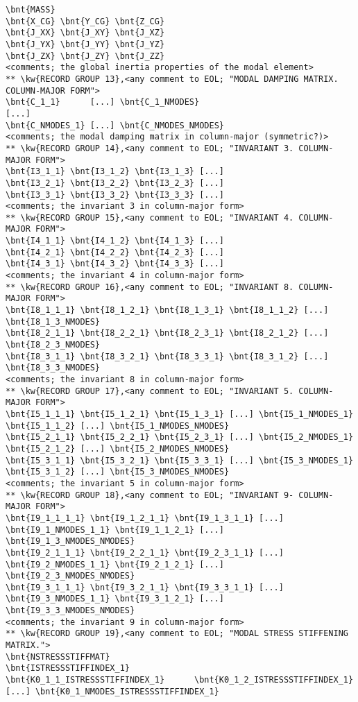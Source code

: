 {\begin{Verbatim}[commandchars=\\\{\}]
\bnt{MASS}
\bnt{X_CG} \bnt{Y_CG} \bnt{Z_CG}
\bnt{J_XX} \bnt{J_XY} \bnt{J_XZ}
\bnt{J_YX} \bnt{J_YY} \bnt{J_YZ}
\bnt{J_ZX} \bnt{J_ZY} \bnt{J_ZZ}
<comments; the global inertia properties of the modal element>
** \kw{RECORD GROUP 13},<any comment to EOL; "MODAL DAMPING MATRIX. COLUMN-MAJOR FORM">
\bnt{C_1_1}      [...] \bnt{C_1_NMODES}
[...]
\bnt{C_NMODES_1} [...] \bnt{C_NMODES_NMODES}
<comments; the modal damping matrix in column-major (symmetric?)>
** \kw{RECORD GROUP 14},<any comment to EOL; "INVARIANT 3. COLUMN-MAJOR FORM">
\bnt{I3_1_1} \bnt{I3_1_2} \bnt{I3_1_3} [...]
\bnt{I3_2_1} \bnt{I3_2_2} \bnt{I3_2_3} [...]
\bnt{I3_3_1} \bnt{I3_3_2} \bnt{I3_3_3} [...]
<comments; the invariant 3 in column-major form>
** \kw{RECORD GROUP 15},<any comment to EOL; "INVARIANT 4. COLUMN-MAJOR FORM">
\bnt{I4_1_1} \bnt{I4_1_2} \bnt{I4_1_3} [...]
\bnt{I4_2_1} \bnt{I4_2_2} \bnt{I4_2_3} [...]
\bnt{I4_3_1} \bnt{I4_3_2} \bnt{I4_3_3} [...]
<comments; the invariant 4 in column-major form>
** \kw{RECORD GROUP 16},<any comment to EOL; "INVARIANT 8. COLUMN-MAJOR FORM">
\bnt{I8_1_1_1} \bnt{I8_1_2_1} \bnt{I8_1_3_1} \bnt{I8_1_1_2} [...] \bnt{I8_1_3_NMODES}
\bnt{I8_2_1_1} \bnt{I8_2_2_1} \bnt{I8_2_3_1} \bnt{I8_2_1_2} [...] \bnt{I8_2_3_NMODES}
\bnt{I8_3_1_1} \bnt{I8_3_2_1} \bnt{I8_3_3_1} \bnt{I8_3_1_2} [...] \bnt{I8_3_3_NMODES}
<comments; the invariant 8 in column-major form>
** \kw{RECORD GROUP 17},<any comment to EOL; "INVARIANT 5. COLUMN-MAJOR FORM">
\bnt{I5_1_1_1} \bnt{I5_1_2_1} \bnt{I5_1_3_1} [...] \bnt{I5_1_NMODES_1} \bnt{I5_1_1_2} [...] \bnt{I5_1_NMODES_NMODES}
\bnt{I5_2_1_1} \bnt{I5_2_2_1} \bnt{I5_2_3_1} [...] \bnt{I5_2_NMODES_1} \bnt{I5_2_1_2} [...] \bnt{I5_2_NMODES_NMODES}
\bnt{I5_3_1_1} \bnt{I5_3_2_1} \bnt{I5_3_3_1} [...] \bnt{I5_3_NMODES_1} \bnt{I5_3_1_2} [...] \bnt{I5_3_NMODES_NMODES}
<comments; the invariant 5 in column-major form>
** \kw{RECORD GROUP 18},<any comment to EOL; "INVARIANT 9- COLUMN-MAJOR FORM">
\bnt{I9_1_1_1_1} \bnt{I9_1_2_1_1} \bnt{I9_1_3_1_1} [...] \bnt{I9_1_NMODES_1_1} \bnt{I9_1_1_2_1} [...] \bnt{I9_1_3_NMODES_NMODES}
\bnt{I9_2_1_1_1} \bnt{I9_2_2_1_1} \bnt{I9_2_3_1_1} [...] \bnt{I9_2_NMODES_1_1} \bnt{I9_2_1_2_1} [...] \bnt{I9_2_3_NMODES_NMODES}
\bnt{I9_3_1_1_1} \bnt{I9_3_2_1_1} \bnt{I9_3_3_1_1} [...] \bnt{I9_3_NMODES_1_1} \bnt{I9_3_1_2_1} [...] \bnt{I9_3_3_NMODES_NMODES}
<comments; the invariant 9 in column-major form>
** \kw{RECORD GROUP 19},<any comment to EOL; "MODAL STRESS STIFFENING MATRIX.">
\bnt{NSTRESSSTIFFMAT}
\bnt{ISTRESSSTIFFINDEX_1}
\bnt{K0_1_1_ISTRESSSTIFFINDEX_1}      \bnt{K0_1_2_ISTRESSSTIFFINDEX_1}      [...] \bnt{K0_1_NMODES_ISTRESSSTIFFINDEX_1}

\end{Verbatim}}
